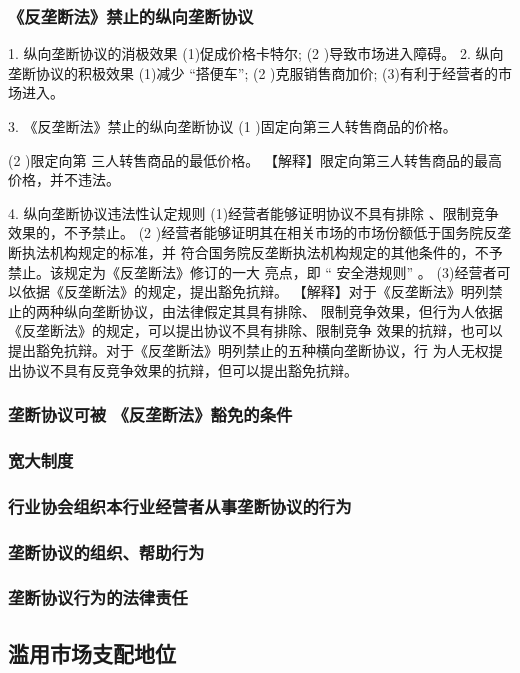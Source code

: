 \documentclass[UTF8,12pt]{ctexart}
\numberwithin{equation}{section} %
\numberwithin{figure}{section}
\numberwithin{table}{section}
\begin{document}
	
	\subsubsection{《反垄断法》禁止的纵向垄断协议}
	1. 纵向垄断协议的消极效果 (1)促成价格卡特尔;
	(2 )导致市场进入障碍。
	2. 纵向垄断协议的积极效果 (1)减少 “搭便车”;
	(2 )克服销售商加价; (3)有利于经营者的市场进入。
	
	
	3. 《反垄断法》禁止的纵向垄断协议
	(1 )固定向第三人转售商品的价格。
	
	(2 )限定向第 三人转售商品的最低价格。
	【解释】限定向第三人转售商品的最高价格，并不违法。
	
	4. 纵向垄断协议违法性认定规则
	(1)经营者能够证明协议不具有排除 、限制竞争效果的，不予禁止。
	(2 )经营者能够证明其在相关市场的市场份额低于国务院反垄断执法机构规定的标准，并 符合国务院反垄断执法机构规定的其他条件的，不予禁止。该规定为《反垄断法》修订的一大 亮点，即 “ 安全港规则” 。
	(3)经营者可以依据《反垄断法》的规定，提出豁免抗辩。
	【解释】对于《反垄断法》明列禁止的两种纵向垄断协议，由法律假定其具有排除、 限制竞争效果，但行为人依据《反垄断法》的规定，可以提出协议不具有排除、限制竞争 效果的抗辩，也可以提出豁免抗辩。对于《反垄断法》明列禁止的五种横向垄断协议，行 为人无权提出协议不具有反竞争效果的抗辩，但可以提出豁免抗辩。
	
	\subsubsection{垄断协议可被 《反垄断法》豁免的条件}
	
	\subsubsection{宽大制度}
	
	\subsubsection{行业协会组织本行业经营者从事垄断协议的行为}
	
	\subsubsection{垄断协议的组织、帮助行为}
	
	\subsubsection{垄断协议行为的法律责任}
	
	\subsection{滥用市场支配地位}
	
\end{document}
